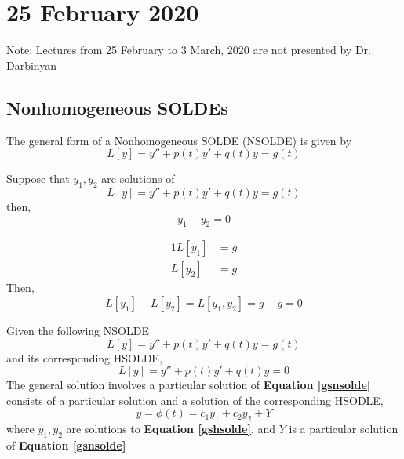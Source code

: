 \documentclass[diffeq.tex]{subfiles}
\begin{document}
\chapter{25 February 2020}
    Note: Lectures from 25 February to 3 March, 2020 are not presented by Dr. Darbinyan
    \section{Nonhomogeneous SOLDEs}
    \begin{definition}
        The general form of a Nonhomogeneous SOLDE (NSOLDE) is given by
        \begin{equation}
            L[y] = y'' + p(t)y' + q(t)y = g(t)
        \end{equation}
    \end{definition}
    \begin{btheorem}
        Suppose that $y_{1}, y_{2}$ are solutions of
        \begin{equation}
            L[y] = y'' + p(t)y' + q(t)y = g(t)
        \end{equation}
        then,
        \begin{equation}
            y_{1} - y_{2} = 0
        \end{equation}
    \end{btheorem}
    \begin{bproof}
        \begin{alignat}{1}
            L[y_{1}] & = g\\
            L[y_{2}] & = g
        \end{alignat}
        Then,
        \begin{equation}
            L[y_{1}] - L[y_{2}] = L[y_{1}, y_{2}] = g - g = 0
        \end{equation}
    \end{bproof}
    \begin{btheorem}
        Given the following NSOLDE
        \begin{equation}
            \label{gsnsolde}
            L[y] = y'' + p(t)y' + q(t)y = g(t)
        \end{equation}
        and its corresponding HSOLDE,
        \begin{equation}
            \label{gshsolde}
            L[y] = y'' + p(t)y' + q(t)y = 0
        \end{equation}
        The general solution involves a particular solution of \textbf{Equation \ref{gsnsolde}} consists of a particular solution and a solution of the corresponding HSODLE,
        \begin{equation}
            \label{gs}
            y = \phi(t) = c_{1}y_{1} + c_{2}y_{2} + Y
        \end{equation}
        where $y_{1}, y_{2}$ are solutions to \textbf{Equation \ref{gshsolde}}, and $Y$ is a particular solution of \textbf{Equation \ref{gsnsolde}}
    \end{btheorem}
\end{document}
